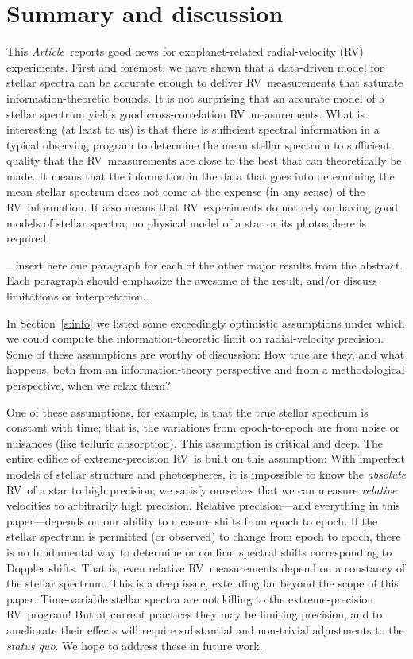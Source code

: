 \documentclass[modern]{aastex63}
\newcommand{\documentname}{\textsl{Article}}
\newcommand{\sectionname}{Section}
\newcommand{\acronym}[1]{{\small{#1}}}
\newcommand{\RV}{\acronym{RV}}
\newcommand{\foreign}[1]{\textsl{#1}}
\begin{document}
\section{Summary and discussion}
\label{s:summary}

This \documentname\ reports good news for exoplanet-related
radial-velocity (\RV) experiments.
First and foremost, we have shown that a data-driven model for
stellar spectra can be accurate enough to deliver
\RV\ measurements that saturate information-theoretic
bounds.
It is not surprising that an accurate model of a stellar spectrum
yields good cross-correlation \RV\ measurements.
What is interesting (at least to us) is that there is sufficient
spectral information in a typical observing
program to determine the mean stellar spectrum to sufficient
quality that the \RV\ measurements are close to the best that can
theoretically be made.
It means that the information in the data that goes into determining
the mean stellar spectrum does not come at the expense (in any sense)
of the \RV\ information.
It also means that \RV\ experiments do not rely on having good models
of stellar spectra; no physical model of a star or its photosphere
is required.

...insert here one paragraph for each of the other major results from
the abstract. Each paragraph should emphasize the awesome of the
result, and/or discuss limitations or interpretation...

In \sectionname~\ref{s:info} we listed some exceedingly
optimistic assumptions under which we could compute the
information-theoretic limit on radial-velocity precision.
Some of these assumptions are worthy of discussion: How true are they,
and what happens, both from an information-theory perspective and from
a methodological perspective, when we relax them?

One of these assumptions, for example, is that the true stellar
spectrum is constant with time; that is, the variations from
epoch-to-epoch are from noise or nuisances (like telluric absorption).
This assumption is critical and deep.
The entire edifice of extreme-precision \RV\ is built on this assumption:
With imperfect models of stellar structure and photospheres, it is
impossible to know the \emph{absolute} \RV\ of a star to high precision;
we satisfy ourselves that we can measure \emph{relative} velocities
to arbitrarily high precision.
Relative precision---and everything in this paper---depends on our
ability to measure shifts from epoch to epoch.
If the stellar spectrum is permitted (or observed) to change from epoch
to epoch, there is no fundamental way to determine or confirm spectral
shifts corresponding to Doppler shifts.
That is, even relative \RV\ measurements depend on a constancy of the
stellar spectrum.
This is a deep issue, extending far beyond the scope of this paper.
Time-variable stellar spectra are not killing to the extreme-precision
\RV\ program!
But at current practices they may be limiting precision,
and to ameliorate their effects will require substantial and non-trivial adjustments to the
\foreign{status quo}.
We hope to address these in future work.
\end{document}
